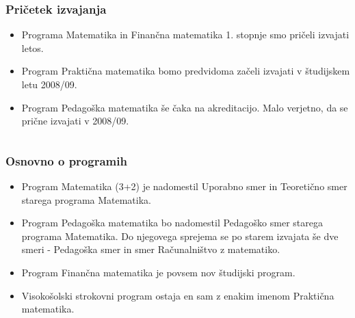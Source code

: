 \documentclass{beamer}
\begin{document}
\begin{frame}\frametitle{Pri\v cetek izvajanja}
\begin{itemize}
\item<1-> Programa \alert{Matematika} in \alert{Finan\v cna matematika} 1. stopnje smo pri\v celi izvajati letos. \pause
\item<2-> Program \alert{Prakti\v cna matematika} bomo predvidoma za\v celi izvajati v \v studijskem letu 2008/09.\pause
\item<3> Program \alert{Pedago\v ska matematika} \v se \v caka na akreditacijo. Malo verjetno, da se pri\v cne 
izvajati v 2008/09.
\end{itemize}

\begin{columns}
\begin{column}{5.4cm}


\end{column}
\begin{column}{5.4cm}


\end{column}
\end{columns}

\end{frame}

\begin{frame}\frametitle{Osnovno o programih}

\begin{itemize}
\item Program \alert{Matematika} (3+2) je nadomestil Uporabno smer in Teoreti\v cno smer starega 
programa Matematika. \pause
\item Program \alert{Pedago\v ska matematika} bo nadomestil Pedago\v sko smer starega programa Matematika. 
Do njegovega sprejema se po starem izvajata \v se dve smeri
- Pedago\v ska smer in smer Ra\v cunalni\v stvo z matematiko.\pause
\item Program \alert{Finan\v cna matematika} je povsem nov \v studijski program.\pause
\item Visoko\v solski strokovni program ostaja en sam z enakim imenom \alert{Prakti\v cna matematika}.
\end{itemize}
\end{frame}
\end{document}
